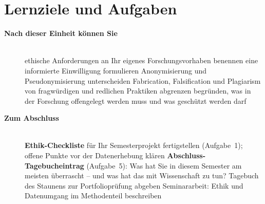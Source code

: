 \section{Lernziele und Aufgaben}
\begin{description}
\item[{\rot\bf Nach dieser Einheit können Sie}]~\\[-\lblskip]
\bi
  \ite ethische Anforderungen an Ihr eigenes Forschungsvorhaben benennen
  \ite eine informierte Einwilligung formulieren
  \ite Anonymisierung und Pseudonymisierung unterscheiden
  \ite Fabrication, Falsification und Plagiarism von fragwürdigen und
    redlichen Praktiken abgrenzen
  \ite begründen, was in der Forschung offengelegt werden muss und was
    geschützt werden darf
\ei
\os{\newpage}

\item[{\rot\bf Zum Abschluss}]~\\[-\lblskip]
\bi
  \ite \textbf{Ethik-Checkliste} für Ihr Semesterprojekt fertigstellen
    (Aufgabe~1); offene Punkte vor der Datenerhebung klären
  \ite \textbf{Abschluss-Tagebucheintrag} (Aufgabe~5): Was hat Sie in
    diesem Semester am meisten überrascht -- und was hat das mit
    Wissenschaft zu tun?
  \ite Tagebuch des Staunens zur Portfolioprüfung abgeben
  \ite Seminararbeit: Ethik und Datenumgang im Methodenteil beschreiben
\ei
\os{\newpage}
\end{description}

